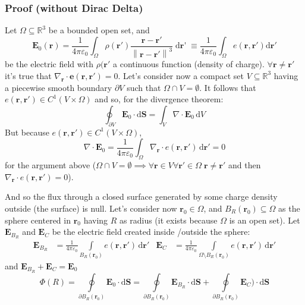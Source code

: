 \documentclass[a4paper]{article}
\begin{document}
\subsubsection{Proof  (without Dirac Delta)}
Let \(\Omega \subseteq \mathbb{R}^3\) be a bounded open set, and
\[
    \mathbf{E}_{0}(\mathbf{r}) = 
    \frac{1}{4\pi \varepsilon_{0}}
    \int_{\Omega} \rho(\mathbf{r}')
    \frac{\mathbf{r} - \mathbf{r}'}{\left\|\mathbf {r} - \mathbf {r}'\right\|^{3}}
    \mathop{\mathrm{d}\mathbf{r}'}
    \equiv \frac{1}{4\pi \varepsilon _{0}}
    \int_{\Omega} e(\mathbf {r,\mathbf {r} '}){\mathrm {d} \mathbf {r}'}
\]
be the electric field with \(\rho(\mathbf{r}'\) a continuous function (density of charge).
\(\forall\mathbf{r} \neq \mathbf{r}'\) it's true that \(\nabla_\mathbf{r}  \cdot \mathbf{e} (\mathbf{r,r'} ) = 0\). 
Let's consider now a compact set \(V \subseteq \mathbb{R}^3\) having a piecewise smooth boundary \(\partial V\) such that \(\Omega \cap V = \emptyset\). It follows that \(e(\mathbf{r},\mathbf{r}') \in C^1(V \times \Omega)\) and so, for the divergence theorem:
\[
    \oint_{\partial V} \mathbf{E}_0 \cdot \mathrm{d}\mathbf{S} = \int_V \nabla \cdot \mathbf{E}_0 \, \mathrm{d}V
\]
But because \(e(\mathbf{r},\mathbf{r}') \in C^1(V \times \Omega)\),
\[
    \nabla \cdot \mathbf{E}_0 = 
    \frac{1}{4\pi\varepsilon_0}
    \int_\Omega \nabla_\mathbf{r} \cdot e(\mathbf{r}, \mathbf{r}')\, \mathrm{d}\mathbf{r}' = 0
\]
for the argument above (\(\Omega \cap V = \emptyset \implies \forall \mathbf{r} \in V \forall \mathbf{r}' \in \Omega \; \mathbf{r} \neq \mathbf{r}'\) and then \(\nabla_\mathbf{r} \cdot e(\mathbf{r}, \mathbf{r}') = 0\)).

And so the flux through a closed surface generated by some charge density outside (the surface) is null. 
Let's consider now \(\mathbf{r}_0 \in \Omega\), and \(B_R(\mathbf{r}_0) \subseteq \Omega\) as the sphere centered in \(\mathbf{r}_0\) having \(R\) as radius (it exists because \(\Omega\) is an open set).
Let \(\mathbf{E}_{B_R}\) and \(\mathbf{E}_C\) be the electric field created inside \slash outside the sphere:
\begin{align*}
    \mathbf{E}_{B_R} &= 
    \frac{1}{4\pi\varepsilon_0}
    \int\limits_{B_R(\mathbf{r}_0)}
        e(\mathbf{r},\mathbf{r}') \, \mathrm{d}\mathbf{r}'
    &
    \mathbf{E}_C &=
    \frac{1}{4\pi\varepsilon_0}
    \int\limits_{\Omega \setminus B_R(\mathbf{r}_0)}
        e(\mathbf{r},\mathbf{r}') \, \mathrm{d}\mathbf{r}'
\end{align*}
and
\(\mathbf{E}_{B_R} + \mathbf{E}_C = \mathbf{E}_0\)
\[
    \Phi(R) = \oint\limits_{\partial B_R(\mathbf{r}_0)}
        \mathbf{E}_0 \cdot \mathrm{d}\mathbf{S}
    = \oint\limits_{\partial B_R(\mathbf{r}_0)}
        \mathbf{E}_{B_R}
        \cdot \mathrm{d}\mathbf{S}
    + \oint\limits_{\partial B_R(\mathbf{r}_0)}
        \mathbf{E}_C)
        \cdot \mathrm{d}\mathbf{S}
\]
\end{document}
